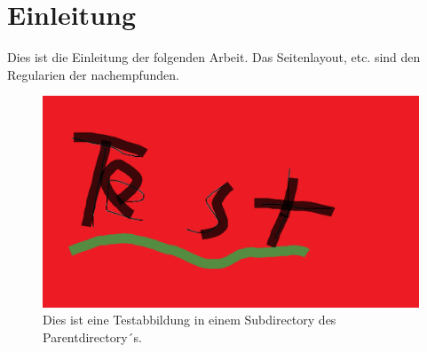 \section{Einleitung}

Dies ist die Einleitung der folgenden Arbeit. Das Seitenlayout, etc. sind den Regularien der \textcite{arbeitsstellefurpolitischesoziologiederbundesrepublikdeutschlandamottosuhrinstitutderfreienuniversitatberlinHandreichungVerfassenHaus2019} nachempfunden.

\blindtext

\begin{figure}
	\includegraphics[width = \linewidth]{../output/figures/testgrafik}
	\caption{Dies ist eine Testabbildung in einem Subdirectory des Parentdirectory´s.} \label{fig:Testabbildung}
\end{figure}